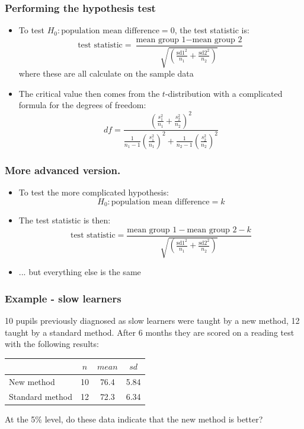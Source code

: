 \documentclass[12pt,xcolor=dvipsnames,handout,mathserif,aspectratio=169]{beamer}
\begin{document}
\begin{frame}
\frametitle{Performing the hypothesis test}
\begin{itemize}
\item To test $H_0: \mbox{population mean difference} = 0$, the test statistic is:
$$\mbox{test statistic} = \frac{\mbox{mean group 1} - \mbox{mean group 2}}{\sqrt{ \left( \frac{\mbox{sd1}^2}{n_1}+\frac{\mbox{sd2}^2}{n_2} \right) }} $$
where these are all calculate on the sample data
\item The critical value then comes from the $t$-distribution with a complicated formula for the degrees of freedom:
$$df = \frac{ \left( \frac{s_1^2}{n_1} + \frac{s_2^2}{n_2} \right)^2 }{ \frac{1}{n_1-1} \left( \frac{s_1^2}{n_1} \right)^2 + \frac{1}{n_2-1} \left( \frac{s_2^2}{n_2} \right)^2 } $$
\end{itemize}
\end{frame}


\begin{frame}
\frametitle{More advanced version.}
\begin{itemize}
\item To test the more complicated hypothesis: $$H_0: \mbox{population mean difference} = k$$
\item The test statistic is then:
$$\mbox{test statistic} = \frac{\mbox{mean group 1} - \mbox{mean group 2} - k}{\sqrt{ \left( \frac{\mbox{sd1}^2}{n_1}+\frac{\mbox{sd2}^2}{n_2} \right) }} $$
\item ... but everything else is the same
\end{itemize}
\end{frame}

\begin{frame}
\frametitle{Example - slow learners}
10 pupils previously diagnosed as slow learners were taught by a new method, 12 taught by a standard method. After 6 months they are scored on a reading test with the following results:
\begin{center}
{\small{
\begin{tabular}{|l|c|c|c|}\hline
& $n$ & $mean$ & $sd$ \\ \hline
New method	& 10 & 76.4 & 5.84 \\
Standard method 	& 12 & 72.3 & 6.34\\ \hline
\end{tabular}}}
\end{center}
\vspace*{0.4cm}
At the 5\% level, do these data indicate that the new method is better?
\end{frame}
\end{document}
